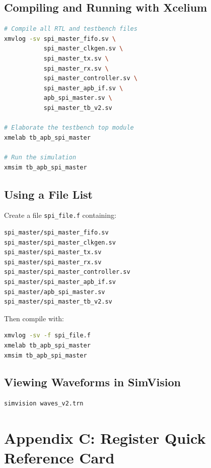 \subsection{Compiling and Running with Xcelium}

\begin{lstlisting}[language=bash,numbers=none]
# Compile all RTL and testbench files
xmvlog -sv spi_master_fifo.sv \
           spi_master_clkgen.sv \
           spi_master_tx.sv \
           spi_master_rx.sv \
           spi_master_controller.sv \
           spi_master_apb_if.sv \
           apb_spi_master.sv \
           spi_master_tb_v2.sv

# Elaborate the testbench top module
xmelab tb_apb_spi_master

# Run the simulation
xmsim tb_apb_spi_master
\end{lstlisting}

\subsection{Using a File List}

Create a file \texttt{spi\_file.f} containing:
\begin{lstlisting}[numbers=none]
spi_master/spi_master_fifo.sv
spi_master/spi_master_clkgen.sv
spi_master/spi_master_tx.sv
spi_master/spi_master_rx.sv
spi_master/spi_master_controller.sv
spi_master/spi_master_apb_if.sv
spi_master/apb_spi_master.sv
spi_master/spi_master_tb_v2.sv
\end{lstlisting}

Then compile with:
\begin{lstlisting}[language=bash,numbers=none]
xmvlog -sv -f spi_file.f
xmelab tb_apb_spi_master
xmsim tb_apb_spi_master
\end{lstlisting}

\subsection{Viewing Waveforms in SimVision}

\begin{lstlisting}[language=bash,numbers=none]
simvision waves_v2.trn
\end{lstlisting}

\section{Appendix C: Register Quick Reference Card}

